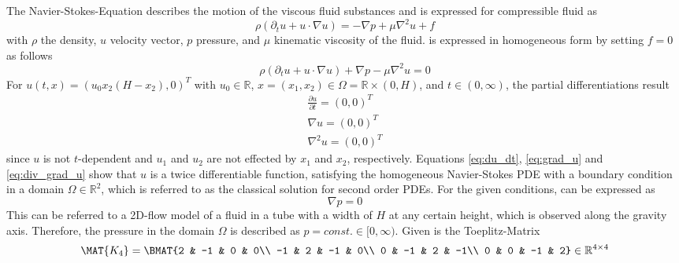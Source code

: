 %
The Navier-Stokes-Equation describes the motion of the viscous fluid substances and is expressed for compressible fluid as
\begin{equation}
	\rho(\partial_t u + u \cdot \nabla u) = - \nabla p + \mu \nabla ^2 u + f
	\label{eq:NavStokes}
\end{equation}
with $\rho$ the density, $u$ velocity vector, $p$ pressure, and $\mu$ kinematic viscosity of the fluid.
 is expressed in homogeneous form by setting $f = 0$ as follows
\begin{equation}
	\rho(\partial_t u + u \cdot \nabla u) + \nabla p - \mu \nabla ^2 u = 0
	\label{eq:NavStokesHom}
\end{equation}
For $u (t,x) = (u_0 x_2 (H - x_2), 0)^T$ with $u_0 \in \mathbb{R}$, $x = (x_ 1, x_2) \in \Omega = \mathbb{R} \times (0, H)$, and $t \in (0, \infty)$, the partial differentiations result
\begin{align}
	\frac{\partial u}{\partial t} = (0,0)^T \label{eq:du_dt}   \\
	\nabla u = (0,0)^T  					\label{eq:grad_u} \\
	\nabla^2 u = (0,0)^T  					\label{eq:div_grad_u}
\end{align}
%
since $u$ is not $t$-dependent and $u_1$ and $u_2$ are not effected by $x_1$ and $x_2$, respectively.
Equations \ref{eq:du_dt}, \ref{eq:grad_u} and \ref{eq:div_grad_u} show that $u$ is a twice differentiable function, satisfying the homogeneous Navier-Stokes PDE with a boundary condition in a domain $\Omega \in \mathbb{R}^2$, which is referred to as the classical solution for second order PDEs.
%
For the given conditions,  can be expressed as
\begin{equation}
	\nabla p = 0
\end{equation}
This can be referred to a 2D-flow model of a fluid in a tube with a width of $H$ at any certain height, which is observed along the gravity axis. Therefore, the pressure in the domain $\Omega$ is described as $p = const. \in [0, \infty)$.
%
Given is the Toeplitz-Matrix
\begin{equation}
	\MAT{K_4} = \BMAT{2 & -1 & 0 & 0\\
				-1 & 2 & -1 & 0\\
				0 & -1 & 2 & -1\\
				0 & 0 & -1 & 2} \in \mathbb{R}^{4 \times 4}
\end{equation}
